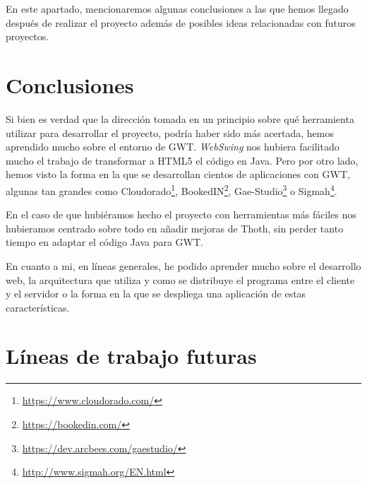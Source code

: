 
En este apartado, mencionaremos algunas conclusiones a las que hemos llegado después de realizar el proyecto además de posibles ideas relacionadas con futuros proyectos.

\section{Conclusiones}

Si bien es verdad que la dirección tomada en un principio sobre qué herramienta utilizar para desarrollar el proyecto, podría haber sido más acertada, hemos aprendido mucho sobre el entorno de GWT. \emph{WebSwing} nos hubiera facilitado mucho el trabajo de transformar a HTML5 el código en Java. Pero por otro lado, hemos visto la forma en la que se desarrollan cientos de aplicaciones con GWT, algunas tan grandes como Cloudorado\footnote{\url{https://www.cloudorado.com/}}, BookedIN\footnote{\url{https://bookedin.com/}}, Gae-Studio\footnote{\url{https://dev.arcbees.com/gaestudio/}} o Sigmah\footnote{\url{http://www.sigmah.org/EN.html}}.

En el caso de que hubiéramos hecho el proyecto con herramientas más fáciles nos hubieramos centrado sobre todo en añadir mejoras de Thoth, sin perder tanto tiempo en adaptar el código Java para GWT. 

En cuanto a mi, en líneas generales, he podido aprender mucho sobre el desarrollo web, la arquitectura que utiliza y como se distribuye el programa entre el cliente y el servidor o la forma en la que se despliega una aplicación de estas características.

\section{Líneas de trabajo futuras}

